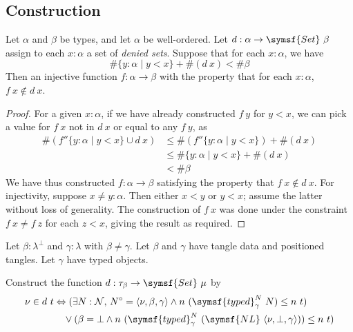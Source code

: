 \subsection{Construction}

\begin{lemma}
    \label{lem:chooseWf}
    Let \( \alpha \) and \( \beta \) be types, and let \( \alpha \) be well-ordered.
    Let \( d : \alpha \to \symsf{Set}\ \beta \) assign to each \( x : \alpha \) a set of \emph{denied sets}.
    Suppose that for each \( x : \alpha \), we have
    \[ \#\{ y : \alpha \mid y < x \} + \#(d\ x) < \#\beta \]
    Then  an injective function \( f : \alpha \to \beta \) with the property that for each \( x : \alpha \), \( f\ x \not\in d\ x \).
\end{lemma}
\begin{proof}
    For a given \( x : \alpha \), if we have already constructed \( f\ y \) for \( y < x \), we can pick a value for \( f\ x \) not in \( d\ x \) or equal to any \( f\ y \), as
    \begin{align*}
        \#(f '' \{ y : \alpha \mid y < x \} \cup d\ x) &\leq \#(f '' \{ y : \alpha \mid y < x \}) + \#(d\ x) \\
        &\leq \#\{ y : \alpha \mid y < x \} + \#(d\ x) \\
        &< \#\beta
    \end{align*}
    We have thus constructed \( f : \alpha \to \beta \) satisfying the property that \( f\ x \not\in d\ x \).
    For injectivity, suppose \( x \neq y : \alpha \).
    Then either \( x < y \) or \( y < x \); assume the latter without loss of generality.
    The construction of \( f\ x \) was done under the constraint \( f\ x \neq f\ z \) for each \( z < x \), giving the result as required.
\end{proof}
Let \( \beta : \lambda^\bot \) and \( \gamma : \lambda \) with \( \beta \neq \gamma \).
Let \( \beta \) and \( \gamma \) have tangle data and positioned tangles.
Let \( \gamma \) have typed objects.
\begin{definition}
    \label{def:fuzz_deny}
    Construct the function \( d : \tau_\beta \to \symsf{Set}\ \mu \) by
    \begin{align*}
        \nu \in d\ t &\Leftrightarrow (\exists N : \mathcal N,\, N^\circ = \langle \nu, \beta, \gamma \rangle \wedge n\ (\symsf{typed}^N_\gamma\ N) \leq n\ t) \\
        &\quad\vee (\beta = \bot \wedge n\ (\symsf{typed}^N_\gamma\ (\symsf{NL}\ \langle \nu, \bot, \gamma \rangle)) \leq n\ t)
    \end{align*}
\end{definition}
